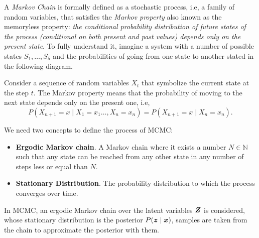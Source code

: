 A \emph{Markov Chain} is formally defined as a stochastic process, i.e, a family of random variables, that satisfies the \emph{Markov property} also known as the memoryless property: \textit{the conditional probability distribution of future states of the process (conditional on both present and past values) depends only on the present state}. To fully understand it, imagine a system with a number of possible states \(S_{1},\dots,S_{5}\) and the probabilities of going from one state to another stated in the following diagram.

\begin{center}
\end{center}

Consider a sequence of random variables \(X_{t}\) that symbolize the current state at the step \(t\). The Markov property means that the probability of moving to the next state depends only on the present one, i.e,
\[
  P(X_{n+1} = x \mid X_{1} = x_{1} \dots, X_{n} = x_{n}) = P(X_{n+1} = x \mid X_{n} = x_{n}).
\]

We need two concepts to define the process of MCMC:
\begin{itemize}
  \item \textbf{Ergodic Markov chain}. A Markov chain where it exists a number \(N \in \mathbb{N}\) such that any state can be reached from any other state in any number of steps less or equal than \(N\).
  \item \textbf{Stationary Distribution}. The probability distribution to which the process converges over time. 
\end{itemize}

In MCMC, an ergodic Markov chain over the latent variables \(\bm{Z}\) is considered, whose stationary distribution is the posterior \(P(\bm{z} \mid \bm{x})\), samples are taken from the chain to approximate the posterior with them.

